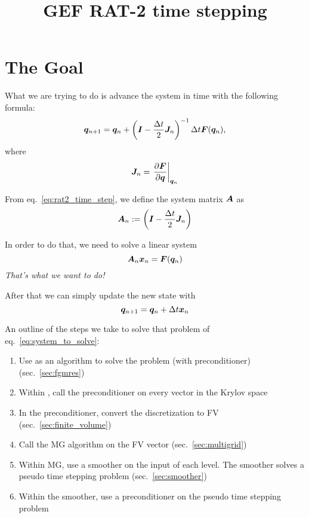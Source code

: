 \documentclass{article}
\title{GEF RAT-2 time stepping}
\begin{document}
\maketitle

\section{The Goal}

What we are trying to do is advance the system in time with the following formula:
\begin{equation}\label{eq:rat2_time_step}
    \bm{q}_{n+1} = \bm{q}_n + \left( \bm{I} - \dfrac{\Delta t}{2}\bm{J}_{n} \right)^{-1} \Delta t \bm{F}(\bm{q}_{n})
    \text{,}
\end{equation}
where
\begin{equation}
    \bm{J}_n = \left. \dfrac{\partial\bm{F}}{\partial\bm{q}} \right|_{\bm{q}_n}
\end{equation}

From eq.~\ref{eq:rat2_time_step}, we define the system matrix $\bm{A}$ as
\begin{equation}\label{eq:system_mat}
    \bm{A}_n := \left( \bm{I} - \dfrac{\Delta t}{2}\bm{J}_{n} \right)
\end{equation}

In order to do that, we need to solve a linear system
\begin{equation}\label{eq:system_to_solve}
    \bm{A}_n \bm{x}_n = \bm{F}(\bm{q}_{n})
\end{equation}
\emph{That's what we want to do!}

After that we can simply update the new state with
\begin{equation}
    \bm{q}_{n+1} = \bm{q}_n + \Delta t\bm{x}_n
\end{equation}

An outline of the steps we take to solve that problem of eq.~\ref{eq:system_to_solve}:
\begin{enumerate}
    \item Use \fgmres{} as an algorithm to solve the problem (with preconditioner) (sec.~\ref{sec:fgmres})
    \item Within \fgmres, call the preconditioner on every vector in the Krylov space 
    \item In the preconditioner, convert the discretization to FV (sec.~\ref{sec:finite_volume})
    \item Call the MG algorithm on the FV vector (sec.~\ref{sec:multigrid})
    \item Within MG, use a smoother on the input of each level. The smoother solves a pseudo time stepping problem (sec.~\ref{sec:smoother})
    \item Within the smoother, use a preconditioner on the pseudo time stepping problem
\end{enumerate}
\end{document}
